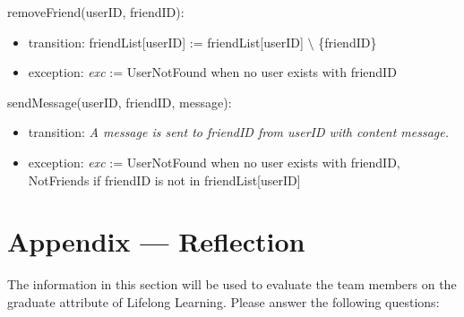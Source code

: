 \documentclass[12pt, titlepage]{article}
\begin{document}
\noindent removeFriend(userID, friendID):
\begin{itemize}
\item transition: friendList[userID] := friendList[userID] $\setminus$ \{friendID\}
\item exception: \textit{exc} := UserNotFound when no user exists with friendID
\end{itemize}

\noindent sendMessage(userID, friendID, message):
\begin{itemize}
\item transition: \textit{A message is sent to friendID from userID with content message.}
\item exception: \textit{exc} := UserNotFound when no user exists with friendID, NotFriends if friendID is not in friendList[userID]
\end{itemize}


\newpage

\section{Appendix --- Reflection}


The information in this section will be used to evaluate the team members on the
graduate attribute of Lifelong Learning.  Please answer the following questions:
\end{document}
